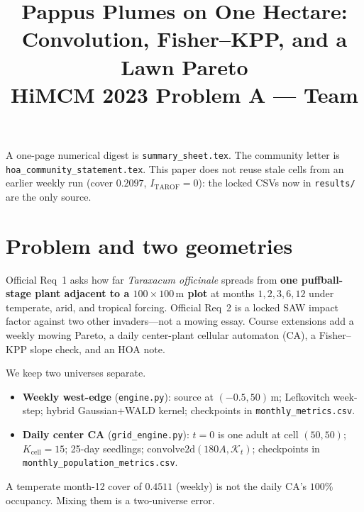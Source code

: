 \documentclass[12pt]{article}
\title{\textbf{Pappus Plumes on One Hectare: Convolution, Fisher--KPP, and a Lawn Pareto}\\[0.4em]
\large HiMCM 2023 Problem A --- Team \TeamNumber}
\author{}
\date{}
\begin{document}
\maketitle
\thispagestyle{empty}

\noindent
A one-page numerical digest is \texttt{summary\_sheet.tex}.
The community letter is \texttt{hoa\_community\_statement.tex}.
This paper does not reuse stale cells from an earlier weekly run
(cover $0.2097$, $I_{\mathrm{TAROF}}=0$): the locked CSVs now in
\texttt{results/} are the only source.

\tableofcontents
\newpage

\section{Problem and two geometries}
Official Req~1 asks how far \emph{Taraxacum officinale} spreads from
\textbf{one puffball-stage plant adjacent to a $100\times 100\,\mathrm{m}$ plot}
at months $1,2,3,6,12$ under temperate, arid, and tropical forcing.
Official Req~2 is a locked SAW impact factor against two other invaders---not
a mowing essay.
Course extensions add a weekly mowing Pareto, a daily center-plant
cellular automaton (CA), a Fisher--KPP slope check, and an HOA note.

We keep two universes separate.
\begin{itemize}
  \item \textbf{Weekly west-edge} (\texttt{engine.py}): source at
        $(-0.5,50)\,\mathrm{m}$; Lefkovitch week-step; hybrid Gaussian+WALD
        kernel; checkpoints in \texttt{monthly\_metrics.csv}.
  \item \textbf{Daily center CA} (\texttt{grid\_engine.py}): $t=0$ is one
        adult at cell $(50,50)$; $K_{\mathrm{cell}}=15$; 25-day seedlings;
        $\mathrm{convolve2d}(180A,\mathcal{K}_t)$; checkpoints in
        \texttt{monthly\_population\_metrics.csv}.
\end{itemize}
A temperate month-12 cover of $0.4511$ (weekly) is not the daily CA's
$100\%$ occupancy. Mixing them is a two-universe error.
\end{document}
